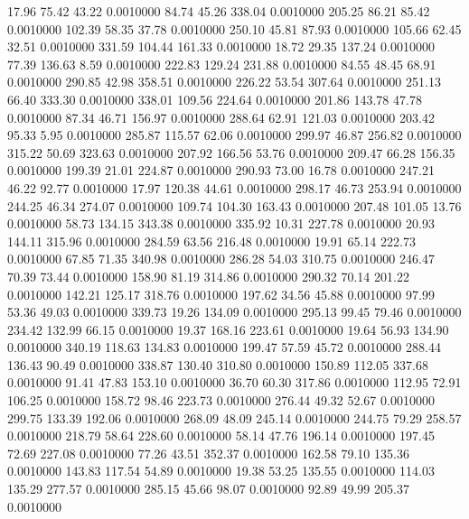   17.96   75.42   43.22   0.0010000
  84.74   45.26  338.04   0.0010000
 205.25   86.21   85.42   0.0010000
 102.39   58.35   37.78   0.0010000
 250.10   45.81   87.93   0.0010000
 105.66   62.45   32.51   0.0010000
 331.59  104.44  161.33   0.0010000
  18.72   29.35  137.24   0.0010000
  77.39  136.63    8.59   0.0010000
 222.83  129.24  231.88   0.0010000
  84.55   48.45   68.91   0.0010000
 290.85   42.98  358.51   0.0010000
 226.22   53.54  307.64   0.0010000
 251.13   66.40  333.30   0.0010000
 338.01  109.56  224.64   0.0010000
 201.86  143.78   47.78   0.0010000
  87.34   46.71  156.97   0.0010000
 288.64   62.91  121.03   0.0010000
 203.42   95.33    5.95   0.0010000
 285.87  115.57   62.06   0.0010000
 299.97   46.87  256.82   0.0010000
 315.22   50.69  323.63   0.0010000
 207.92  166.56   53.76   0.0010000
 209.47   66.28  156.35   0.0010000
 199.39   21.01  224.87   0.0010000
 290.93   73.00   16.78   0.0010000
 247.21   46.22   92.77   0.0010000
  17.97  120.38   44.61   0.0010000
 298.17   46.73  253.94   0.0010000
 244.25   46.34  274.07   0.0010000
 109.74  104.30  163.43   0.0010000
 207.48  101.05   13.76   0.0010000
  58.73  134.15  343.38   0.0010000
 335.92   10.31  227.78   0.0010000
  20.93  144.11  315.96   0.0010000
 284.59   63.56  216.48   0.0010000
  19.91   65.14  222.73   0.0010000
  67.85   71.35  340.98   0.0010000
 286.28   54.03  310.75   0.0010000
 246.47   70.39   73.44   0.0010000
 158.90   81.19  314.86   0.0010000
 290.32   70.14  201.22   0.0010000
 142.21  125.17  318.76   0.0010000
 197.62   34.56   45.88   0.0010000
  97.99   53.36   49.03   0.0010000
 339.73   19.26  134.09   0.0010000
 295.13   99.45   79.46   0.0010000
 234.42  132.99   66.15   0.0010000
  19.37  168.16  223.61   0.0010000
  19.64   56.93  134.90   0.0010000
 340.19  118.63  134.83   0.0010000
 199.47   57.59   45.72   0.0010000
 288.44  136.43   90.49   0.0010000
 338.87  130.40  310.80   0.0010000
 150.89  112.05  337.68   0.0010000
  91.41   47.83  153.10   0.0010000
  36.70   60.30  317.86   0.0010000
 112.95   72.91  106.25   0.0010000
 158.72   98.46  223.73   0.0010000
 276.44   49.32   52.67   0.0010000
 299.75  133.39  192.06   0.0010000
 268.09   48.09  245.14   0.0010000
 244.75   79.29  258.57   0.0010000
 218.79   58.64  228.60   0.0010000
  58.14   47.76  196.14   0.0010000
 197.45   72.69  227.08   0.0010000
  77.26   43.51  352.37   0.0010000
 162.58   79.10  135.36   0.0010000
 143.83  117.54   54.89   0.0010000
  19.38   53.25  135.55   0.0010000
 114.03  135.29  277.57   0.0010000
 285.15   45.66   98.07   0.0010000
  92.89   49.99  205.37   0.0010000
